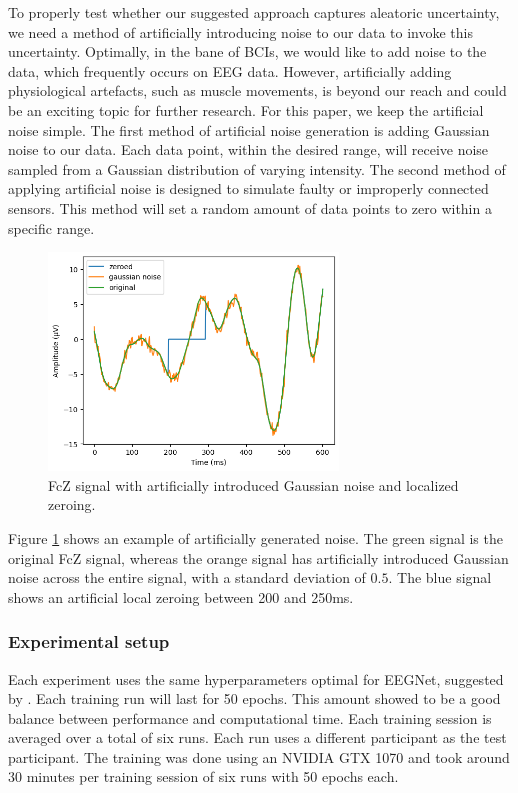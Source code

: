 To properly test whether our suggested approach captures aleatoric uncertainty, we need a method of artificially introducing noise to our data to invoke this uncertainty. Optimally, in the bane of BCIs, we would like to add noise to the data, which frequently occurs on EEG data. However, artificially adding physiological artefacts, such as muscle movements, is beyond our reach and could be an exciting topic for further research. For this paper, we keep the artificial noise simple. The first method of artificial noise generation is adding Gaussian noise to our data. Each data point, within the desired range, will receive noise sampled from a Gaussian distribution of varying intensity. The second method of applying artificial noise is designed to simulate faulty or improperly connected sensors. This method will set a random amount of data points to zero within a specific range.

\begin{figure}[!tbp]
    \centering
        \includegraphics[width=7.7cm]{img/noise.png}
    \caption{FcZ signal with artificially introduced Gaussian noise and localized zeroing.}
    \label{fig:noise}
\end{figure}

Figure \ref{fig:noise} shows an example of artificially generated noise. The green signal is the original FcZ signal, whereas the orange signal has artificially introduced Gaussian noise across the entire signal, with a standard deviation of $0.5$. The blue signal shows an artificial local zeroing between 200 and 250ms.

\subsubsection{Experimental setup}

Each experiment uses the same hyperparameters optimal for EEGNet, suggested by \cite{lawhern2018eegnet}. Each training run will last for 50 epochs. This amount showed to be a good balance between performance and computational time. Each training session is averaged over a total of six runs. Each run uses a different participant as the test participant. The training was done using an NVIDIA GTX 1070 and took around 30 minutes per training session of six runs with 50 epochs each.

